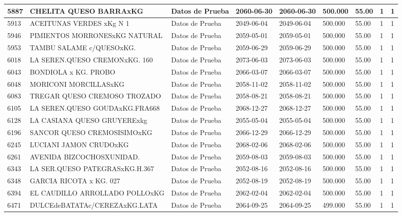 \documentclass[a4paper,12pt]{article}
\begin{document}
\begin{landscape}
\begin{longtable}{|p{4cm}|p{2.5cm}|p{2.5cm}|p{1.8cm}|p{1.8cm}|p{1cm}|p{1cm}|p{3cm}|p{3cm}||}
5887 & CHELITA QUESO BARRAxKG & Datos de Prueba & 2060-06-30 & 2060-06-30 & 500.000 & 55.00 & 1 & 1 \\ \hline 
5913 & ACEITUNAS VERDES xKg N 1 & Datos de Prueba & 2049-06-04 & 2049-06-04 & 500.000 & 55.00 & 1 & 1 \\ \hline 
5946 & PIMIENTOS MORRONESxKG NATURAL & Datos de Prueba & 2059-05-01 & 2059-05-01 & 500.000 & 55.00 & 1 & 1 \\ \hline 
5953 & TAMBU SALAME c/QUESOxKG. & Datos de Prueba & 2059-06-29 & 2059-06-29 & 500.000 & 55.00 & 1 & 1 \\ \hline 
6018 & LA SEREN.QUESO CREMONxKG.  160 & Datos de Prueba & 2073-06-03 & 2073-06-03 & 500.000 & 55.00 & 1 & 1 \\ \hline 
6043 & BONDIOLA x KG. PROBO & Datos de Prueba & 2066-03-07 & 2066-03-07 & 500.000 & 55.00 & 1 & 1 \\ \hline 
6048 & MORICONI MORCILLASxKG & Datos de Prueba & 2058-11-02 & 2058-11-02 & 500.000 & 55.00 & 1 & 1 \\ \hline 
6083 & TREGAR QUESO CREMOSO TROZADO & Datos de Prueba & 2058-08-21 & 2058-08-21 & 500.000 & 55.00 & 1 & 1 \\ \hline 
6105 & LA SEREN.QUESO GOUDAxKG.FRA668 & Datos de Prueba & 2068-12-27 & 2068-12-27 & 500.000 & 55.00 & 1 & 1 \\ \hline 
6128 & LA CASIANA QUESO GRUYERExkg & Datos de Prueba & 2055-05-04 & 2055-05-04 & 500.000 & 55.00 & 1 & 1 \\ \hline 
6196 & SANCOR QUESO CREMOSISIMOxKG & Datos de Prueba & 2066-12-29 & 2066-12-29 & 500.000 & 55.00 & 1 & 1 \\ \hline 
6245 & LUCIANI JAMON CRUDOxKG & Datos de Prueba & 2068-02-06 & 2068-02-06 & 500.000 & 55.00 & 1 & 1 \\ \hline 
6261 & AVENIDA BIZCOCHOSXUNIDAD. & Datos de Prueba & 2059-08-03 & 2059-08-03 & 500.000 & 55.00 & 1 & 1 \\ \hline 
6343 & LA SER.QUESO PATEGRASxKG.H.367 & Datos de Prueba & 2052-08-16 & 2052-08-16 & 500.000 & 55.00 & 1 & 1 \\ \hline 
6348 & GARCIA RICOTA x KG.        027 & Datos de Prueba & 2052-08-19 & 2052-08-19 & 500.000 & 55.00 & 1 & 1 \\ \hline 
6394 & EL CAUDILLO ARROLLADO POLLOxKG & Datos de Prueba & 2062-02-04 & 2062-02-04 & 500.000 & 55.00 & 1 & 1 \\ \hline 
6471 & DULCEdeBATATAc/CEREZAxKG.LATA & Datos de Prueba & 2064-09-25 & 2064-09-25 & 499.000 & 55.00 & 1 & 1 \\ \hline 

\end{longtable}
\end{landscape}
\end{document}

